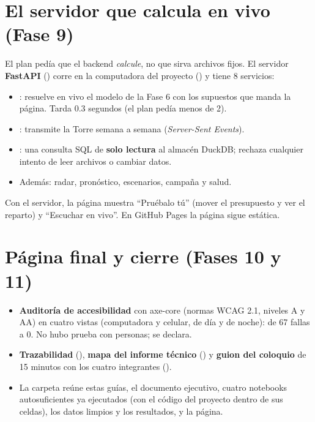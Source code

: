 \section{El servidor que calcula en vivo (Fase 9)}
El plan pedía que el backend \emph{calcule}, no que sirva archivos fijos. El servidor \textbf{FastAPI}
() corre en la computadora del proyecto () y tiene 8 servicios:
\begin{itemize}
\item {}: resuelve en vivo el modelo de la Fase 6 con los supuestos que manda la página. Tarda
  0.3 segundos (el plan pedía menos de 2).
\item {}: transmite la Torre semana a semana (\emph{Server-Sent Events}).
\item {}: una consulta SQL de \textbf{solo lectura} al almacén DuckDB; rechaza cualquier intento de leer
  archivos o cambiar datos.
\item Además: radar, pronóstico, escenarios, campaña y salud.
\end{itemize}
Con el servidor, la página muestra ``Pruébalo tú'' (mover el presupuesto y ver el reparto) y ``Escuchar en vivo''. En GitHub
Pages la página sigue estática.

\section{Página final y cierre (Fases 10 y 11)}
\begin{itemize}
\item \textbf{Auditoría de accesibilidad} con axe-core (normas WCAG 2.1, niveles A y AA) en cuatro vistas (computadora y
  celular, de día y de noche): de 67 fallas a 0. No hubo prueba con personas; se declara.
\item \textbf{Trazabilidad} (), \textbf{mapa del informe técnico}
  () y \textbf{guion del coloquio} de 15 minutos con los cuatro integrantes
  ().
\item La carpeta  reúne estas guías, el documento ejecutivo, cuatro notebooks autosuficientes ya
  ejecutados (con el código del proyecto dentro de sus celdas), los datos limpios y los resultados, y la página.
\end{itemize}
